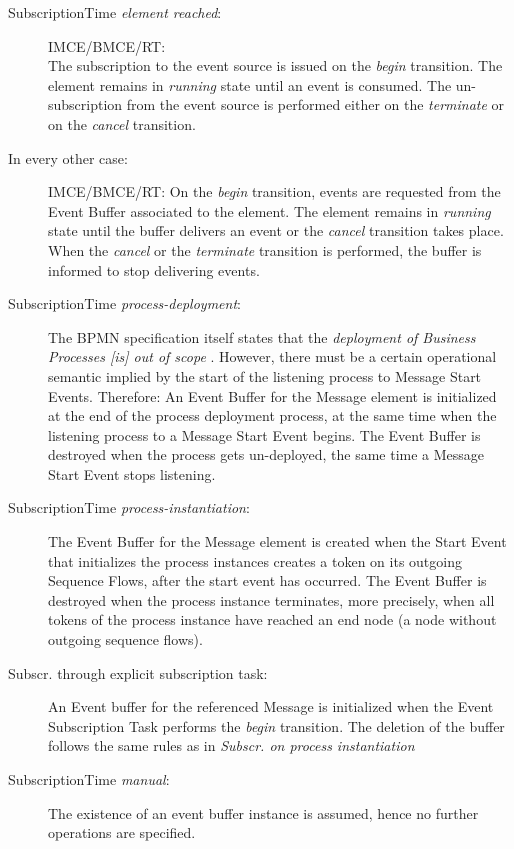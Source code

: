 \begin{description}
	\item[SubscriptionTime \textit{element reached}:]
	IMCE/BMCE/RT:\\ The subscription to the event source is issued on the \textit{begin} transition. The element remains in \textit{running} state until an event is consumed. The un-subscription from the event source is performed either on the \textit{terminate} or on the \textit{cancel} transition.
	
	\item[In every other case:] 
	IMCE/BMCE/RT: On the \textit{begin} transition, events are requested from the Event Buffer associated to the element.
	The element remains in \textit{running} state until the buffer delivers an event or the \textit{cancel}	transition takes place.
	When the \textit{cancel} or the \textit{terminate} transition is performed, the buffer is informed to stop delivering events.
	
	\item[SubscriptionTime \textit{process-deployment}:]
	The BPMN specification itself states that the \textit{deployment of Business Processes [is] out of scope} \cite[p.\,22]{bpmnspec}.
	However, there must be a certain operational semantic implied by the start of the listening process to Message Start Events.
	Therefore: An Event Buffer for the Message element is initialized at the end of the process deployment process, at the same time when the listening process to a Message Start Event begins.
	The Event Buffer is destroyed when the process gets un-deployed, the same time a Message Start Event stops listening.
	
	\item[SubscriptionTime \textit{process-instantiation}:] 
	The Event Buffer for the Message element is created when the Start Event that initializes the process instances creates a token on its outgoing Sequence Flows, \ie after the start event has occurred.
	The Event Buffer is destroyed when the process instance terminates, more precisely, when all tokens of the process instance have reached an end node (a node without outgoing sequence flows).
	
	\item[Subscr. through explicit subscription task:]
	An Event buffer for the referenced Message is initialized when the Event Subscription Task performs the \textit{begin} transition.
	The deletion of the buffer follows the same rules as in \textit{Subscr. on process instantiation}
	
	\item[SubscriptionTime \textit{manual}:]
	The existence of an event buffer instance is assumed, hence no further operations are specified.
\end{description}




